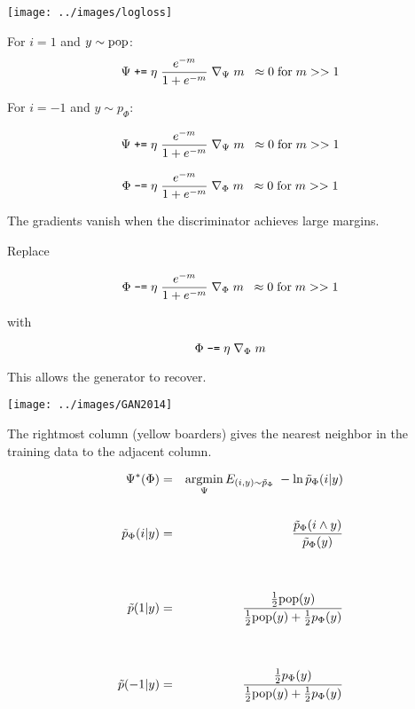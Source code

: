 {\centerline{\texttt{[image: ../images/logloss]}}


For $i = 1$ and $y \sim \mathrm{pop}$:
$$\Psi \;\mbox{\tt +=} \; \eta\;\frac{e^{-m}}{1 + e^{-m}}\;\nabla_\Psi \; m \;\;\approx 0 \;\mbox{for}\;m >> 1$$

\vfill
For $i = -1$ and $y \sim p_\Phi$:

$$\Psi \;\mbox{\tt +=} \; \eta\;\frac{e^{-m}}{1 + e^{-m}}\;\nabla_\Psi\;m \;\;\approx 0 \;\mbox{for}\;m >> 1$$

\vfill
$$\Phi \;\mbox{\tt -=} \; \eta\;\frac{e^{-m}}{1 + e^{-m}}\;\nabla_\Phi\;m \;\;\approx 0 \;\mbox{for}\;m >> 1$$

\vfill
The gradients vanish when the discriminator achieves large margins.


Replace

$$\Phi \;\mbox{\tt -=} \; \eta\;\frac{e^{-m}}{1 + e^{-m}}\;\nabla_\Phi\; m \;\;\approx 0 \;\mbox{for}\;m >> 1$$

\vfill
with

$$\Phi \;\mbox{\tt -=} \; \eta\;\nabla_\Phi\;m$$

\vfill
This allows the generator to recover.

\centerline{\texttt{[image: ../images/GAN2014]}}
The rightmost column (yellow boarders) gives the nearest neighbor in the training data to the adjacent column.


\begin{eqnarray*}
\Psi^*(\Phi) & = & \operatorname*{argmin}_\Psi  E_{(i,y) \sim \tilde{p}_\Phi}\; - \ln \tilde{p}_\Phi(i|y) \\
\\
\tilde{p}_\Phi(i|y) & = & \frac{\tilde{p}_\Phi(i \wedge y)}{\tilde{p}_\Phi(y)} \\
\\
\\
\tilde{p}(1|y) & = & \frac{\frac{1}{2}\mathrm{pop}(y)}{\frac{1}{2}\mathrm{pop}(y) + \frac{1}{2}p_\Phi(y)} \\
\\
\\
\tilde{p}(-1|y) & = & \frac{\frac{1}{2}p_\Phi(y)}{\frac{1}{2}\mathrm{pop}(y) + \frac{1}{2}p_\Phi(y)}
\end{eqnarray*}


}
